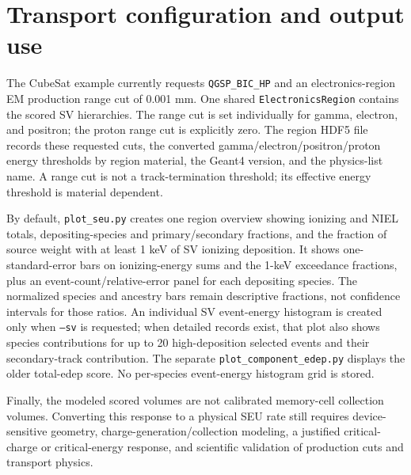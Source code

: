 \documentclass[11pt]{article}
\begin{document}
\section{Transport configuration and output use}

The CubeSat example currently requests \texttt{QGSP\_BIC\_HP} and an
electronics-region EM production range cut of 0.001 mm. One shared
\texttt{ElectronicsRegion} contains the scored SV hierarchies. The range cut
is set individually for gamma, electron, and positron; the proton range cut
is explicitly zero. The region HDF5 file records these requested cuts,
the converted gamma/electron/positron/proton energy thresholds by region
material, the Geant4 version, and the physics-list name. A range cut is not
a track-termination threshold; its effective energy threshold is material
dependent.

By default, \texttt{plot\_seu.py} creates one region overview showing
ionizing and NIEL totals, depositing-species and primary/secondary fractions,
and the fraction of source weight with at least 1 keV of SV ionizing
deposition. It shows one-standard-error bars on ionizing-energy sums and the
1-keV exceedance fractions, plus an event-count/relative-error panel for each
depositing species. The normalized species and ancestry bars remain descriptive
fractions, not confidence intervals for those ratios. An individual SV event-energy histogram is created only when
\texttt{--sv} is requested; when detailed records exist, that plot also shows
species contributions for up to 20 high-deposition selected events and their
secondary-track contribution. The separate
\texttt{plot\_component\_edep.py} displays the older total-edep score.
No per-species event-energy histogram grid is stored.

Finally, the modeled scored volumes are not calibrated memory-cell collection
volumes. Converting this response to a physical SEU rate still requires
device-sensitive geometry, charge-generation/collection modeling, a justified
critical-charge or critical-energy response, and scientific validation of
production cuts and transport physics.
\end{document}
